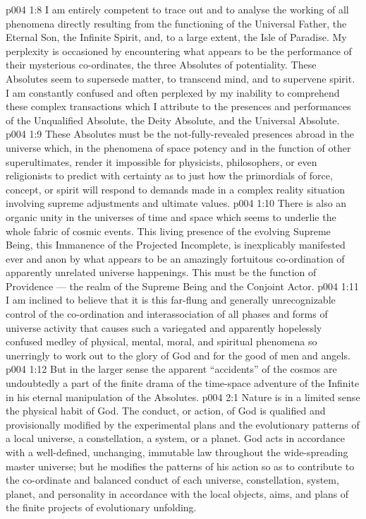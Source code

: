 \vs p004 1:8 I am entirely competent to trace out and to analyse the working of all phenomena directly resulting from the functioning of the Universal Father, the Eternal Son, the Infinite Spirit, and, to a large extent, the Isle of Paradise. My perplexity is occasioned by encountering what appears to be the performance of their mysterious co\hyp{}ordinates, the three Absolutes of potentiality. These Absolutes seem to supersede matter, to transcend mind, and to supervene spirit. I am constantly confused and often perplexed by my inability to comprehend these complex transactions which I attribute to the presences and performances of the Unqualified Absolute, the Deity Absolute, and the Universal Absolute.
\vs p004 1:9 These Absolutes must be the not\hyp{}fully\hyp{}revealed presences abroad in the universe which, in the phenomena of space potency and in the function of other superultimates, render it impossible for physicists, philosophers, or even religionists to predict with certainty as to just how the primordials of force, concept, or spirit will respond to demands made in a complex reality situation involving supreme adjustments and ultimate values.
\vs p004 1:10 \pc There is also an organic unity in the universes of time and space which seems to underlie the whole fabric of cosmic events. This living presence of the evolving Supreme Being, this Immanence of the Projected Incomplete, is inexplicably manifested ever and anon by what appears to be an amazingly fortuitous co\hyp{}ordination of apparently unrelated universe happenings. This must be the function of Providence --- the realm of the Supreme Being and the Conjoint Actor.
\vs p004 1:11 I am inclined to believe that it is this far\hyp{}flung and generally unrecognizable control of the co\hyp{}ordination and interassociation of all phases and forms of universe activity that causes such a variegated and apparently hopelessly confused medley of physical, mental, moral, and spiritual phenomena so unerringly to work out to the glory of God and for the good of men and angels.
\vs p004 1:12 But in the larger sense the apparent “accidents” of the cosmos are undoubtedly a part of the finite drama of the time\hyp{}space adventure of the Infinite in his eternal manipulation of the Absolutes.
\vs p004 2:1 Nature is in a limited sense the physical habit of God. The conduct, or action, of God is qualified and provisionally modified by the experimental plans and the evolutionary patterns of a local universe, a constellation, a system, or a planet. God acts in accordance with a well\hyp{}defined, unchanging, immutable law throughout the wide\hyp{}spreading master universe; but he modifies the patterns of his action so as to contribute to the co\hyp{}ordinate and balanced conduct of each universe, constellation, system, planet, and personality in accordance with the local objects, aims, and plans of the finite projects of evolutionary unfolding.
